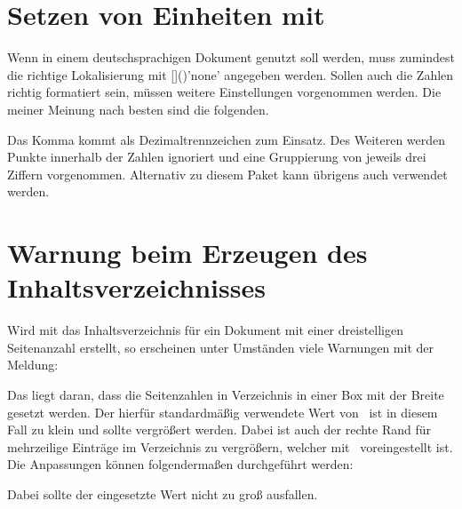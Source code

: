 \section{Setzen von Einheiten mit }
%
%
%
Wenn  in einem deutschsprachigen Dokument genutzt soll
werden, muss zumindest die richtige Lokalisierung mit
[]()'none' angegeben 
werden. Sollen auch die Zahlen richtig formatiert sein, müssen weitere 
Einstellungen vorgenommen werden. Die meiner Meinung nach besten sind die 
folgenden.
%
\begin{quoting}
\begin{Code}
\end{Code}
\end{quoting}
%
Das Komma kommt als Dezimaltrennzeichen zum Einsatz. Des Weiteren werden Punkte 
innerhalb der Zahlen ignoriert und eine Gruppierung von jeweils drei Ziffern 
vorgenommen. Alternativ zu diesem Paket kann übrigens auch  
verwendet werden.



\section{Warnung beim Erzeugen des Inhaltsverzeichnisses}
%
%
Wird mit  das Inhaltsverzeichnis für ein Dokument mit 
einer dreistelligen Seitenanzahl erstellt, so erscheinen unter Umständen viele 
Warnungen mit der Meldung:
%
\begin{quoting}
\end{quoting}
%
Das liegt daran, dass die Seitenzahlen in Verzeichnis in einer Box mit der 
Breite  gesetzt werden. Der hierfür standardmäßig verwendete 
Wert von~\PValue{1.55em} ist in diesem Fall zu klein und sollte vergrößert 
werden. Dabei ist auch der rechte Rand für mehrzeilige Einträge im Verzeichnis 
 zu vergrößern, welcher mit~\PValue{2.55em} voreingestellt 
ist. Die Anpassungen können folgendermaßen durchgeführt werden:
%
\begin{quoting}
\begin{Code}
\makeatletter
\renewcommand*{\@pnumwidth}{1.7em}
\renewcommand*{\@tocrmarg}{2.7em}
\makeatother
\end{Code}
\end{quoting}
%
Dabei sollte der eingesetzte Wert nicht zu groß ausfallen.



